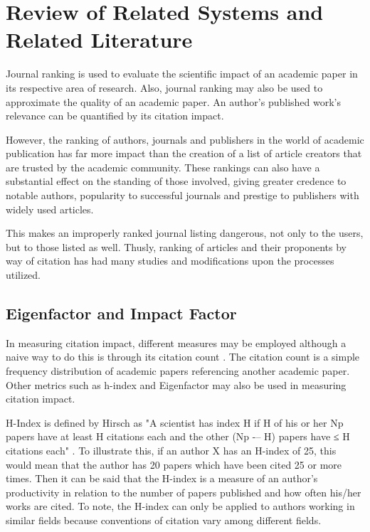 \chapter{Review of Related Systems and Related Literature}
	Journal ranking is used to evaluate the scientific impact of an academic paper in its respective area of research. Also, journal ranking may also be used to approximate the quality of an academic paper. An author's published work's relevance can be quantified by its citation impact.

	However, the ranking of authors, journals and publishers in the world of academic publication has far more impact than the creation of a list of article creators that are trusted by the academic community. These rankings can also have a substantial effect on the standing of those involved, giving greater credence to notable authors, popularity to successful journals and prestige to publishers with widely used articles. 

	This makes an improperly ranked journal listing dangerous, not only to the users, but to those listed as well. Thusly, ranking of articles and their proponents by way of citation has had many studies and modifications upon the processes utilized.

\section{Eigenfactor and Impact Factor}
In measuring citation impact, different measures may be employed although a naive way to do this is through its citation count \cite{citation_frequency}. The citation count is a simple frequency distribution of academic papers referencing another academic paper. Other metrics such as h-index and Eigenfactor may also be used in measuring citation impact.

H-Index is defined by Hirsch as "A scientist has index H if H of his or her Np papers have at least H citations each and the other (Np -– H) papers have ≤ H citations each" \cite{h_index}. To illustrate this, if an author X has an H-index of 25, this would mean that the author has 20 papers which have been cited 25 or more times. Then it can be said that the H-index is a measure of an author's productivity in relation to the number of papers published and how often his/her works are cited. To note, the H-index can only be applied to authors working in similar fields because conventions of citation vary among different fields.

